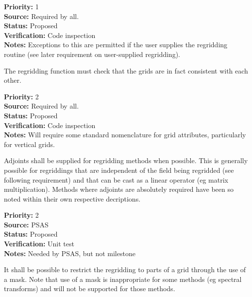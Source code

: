 \begin{reqlist}
{\bf Priority:} 1 \\
{\bf Source:} Required by all. \\
{\bf Status:} Proposed \\
{\bf Verification:} Code inspection  \\
{\bf Notes:} Exceptions to this are permitted if the user
             supplies the regridding routine (see later
             requirement on user-supplied regridding).
\end{reqlist}


The regridding function must check that the grids are in fact consistent
with each other.

\begin{reqlist}
{\bf Priority:} 2 \\
{\bf Source:} Required by all. \\
{\bf Status:} Proposed \\
{\bf Verification:} Code inspection  \\
{\bf Notes:} Will require some standard nomenclature for grid attributes,
             particularly for vertical grids.
\end{reqlist}


Adjoints shall be supplied for regridding methods when possible.  This is 
generally possible for regriddings that are independent of the field being 
regridded (see following requirement) and that can be cast as a linear 
operator (eg matrix multiplication).  Methods where adjoints are absolutely 
required have been so noted within their own respective decriptions.

\begin{reqlist}
{\bf Priority:} 2 \\
{\bf Source:} PSAS \\
{\bf Status:} Proposed \\
{\bf Verification:} Unit test \\
{\bf Notes:} Needed by PSAS, but not milestone
\end{reqlist}


It shall be possible to restrict the regridding to parts of a grid through 
the use of a mask.  Note that use of a mask is inappropriate for some methods 
(eg spectral transforms) and will not be supported for those methods.

